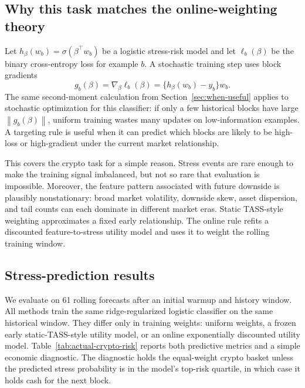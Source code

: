 \documentclass{article}
\newcommand{\1}{\mathbf{1}}
\newcommand{\norm}[1]{\left\lVert #1 \right\rVert}
\begin{document}
\subsection{Why this task matches the online-weighting theory}

Let $h_\beta(w_b)=\sigma(\beta^\top w_b)$ be a logistic stress-risk model and let $\ell_b(\beta)$ be the binary cross-entropy loss for example $b$. A stochastic training step uses block gradients
\[
  g_b(\beta)
  =
  \nabla_\beta \ell_b(\beta)
  =
  \{h_\beta(w_b)-y_b\}w_b.
\]
The same second-moment calculation from Section~\ref{sec:when-useful} applies to stochastic optimization for this classifier: if only a few historical blocks have large $\norm{g_b(\beta)}$, uniform training wastes many updates on low-information examples. A targeting rule is useful when it can predict which blocks are likely to be high-loss or high-gradient under the current market relationship.

This covers the crypto task for a simple reason. Stress events are rare enough to make the training signal imbalanced, but not so rare that evaluation is impossible. Moreover, the feature pattern associated with future downside is plausibly nonstationary: broad market volatility, downside skew, asset dispersion, and tail counts can each dominate in different market eras. Static TASS-style weighting approximates a fixed early relationship. The online rule refits a discounted feature-to-stress utility model and uses it to weight the rolling training window.

\subsection{Stress-prediction results}

We evaluate on 61 rolling forecasts after an initial warmup and history window. All methods train the same ridge-regularized logistic classifier on the same historical window. They differ only in training weights: uniform weights, a frozen early static-TASS-style utility model, or an online exponentially discounted utility model. Table~\ref{tab:actual-crypto-risk} reports both predictive metrics and a simple economic diagnostic. The diagnostic holds the equal-weight crypto basket unless the predicted stress probability is in the model's top-risk quartile, in which case it holds cash for the next block.

\begin{table}[t]
  \centering
  \caption{Actual crypto stress-prediction task. The target is whether the next 10-day equal-weight crypto basket return is below $-7\%$. Online weighting gives the best log loss, Brier score, AUC, and concentration of realized stress events in the top-risk quartile. The risk-off strategy is included as an interpretable diagnostic rather than a production trading rule.}
  \label{tab:actual-crypto-risk}
  \resizebox{\linewidth}{!}{}
\end{table}
\end{document}

